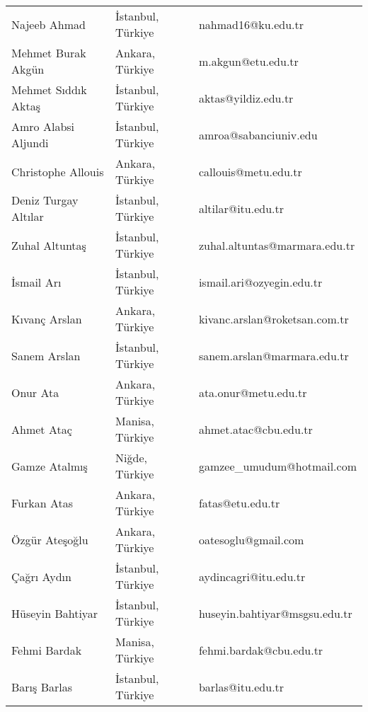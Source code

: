 {\small
\begin{longtable}[c]{@{}lll@{}}
\rowcolor[HTML]{C0C0C0} 
Najeeb Ahmad & İstanbul, Türkiye & nahmad16@ku.edu.tr \\
Mehmet Burak Akgün & Ankara, Türkiye & m.akgun@etu.edu.tr \\
\rowcolor[HTML]{C0C0C0} 
Mehmet Sıddık Aktaş & İstanbul, Türkiye & aktas@yildiz.edu.tr \\
Amro Alabsi Aljundi & İstanbul, Türkiye & amroa@sabanciuniv.edu \\
\rowcolor[HTML]{C0C0C0} 
Christophe Allouis & Ankara, Türkiye & callouis@metu.edu.tr \\
Deniz Turgay Altılar & İstanbul, Türkiye & altilar@itu.edu.tr \\
\rowcolor[HTML]{C0C0C0} 
Zuhal Altuntaş & İstanbul, Türkiye & zuhal.altuntas@marmara.edu.tr \\
İsmail Arı & İstanbul, Türkiye & ismail.ari@ozyegin.edu.tr \\
\rowcolor[HTML]{C0C0C0} 
Kıvanç Arslan & Ankara, Türkiye & kivanc.arslan@roketsan.com.tr \\
Sanem Arslan & İstanbul, Türkiye & sanem.arslan@marmara.edu.tr \\
\rowcolor[HTML]{C0C0C0} 
Onur Ata & Ankara, Türkiye & ata.onur@metu.edu.tr \\
Ahmet Ataç & Manisa, Türkiye & ahmet.atac@cbu.edu.tr \\
\rowcolor[HTML]{C0C0C0} 
Gamze Atalmış & Niğde, Türkiye & gamzee\_umudum@hotmail.com \\
Furkan Atas & Ankara, Türkiye & fatas@etu.edu.tr \\
\rowcolor[HTML]{C0C0C0} 
Özgür Ateşoğlu & Ankara, Türkiye & oatesoglu@gmail.com \\
Çağrı Aydın & İstanbul, Türkiye & aydincagri@itu.edu.tr \\
\rowcolor[HTML]{C0C0C0} 
Hüseyin Bahtiyar & İstanbul, Türkiye & huseyin.bahtiyar@msgsu.edu.tr \\
Fehmi Bardak & Manisa, Türkiye & fehmi.bardak@cbu.edu.tr \\
\rowcolor[HTML]{C0C0C0} 
Barış Barlas & İstanbul, Türkiye & barlas@itu.edu.tr \\

\end{longtable}}
